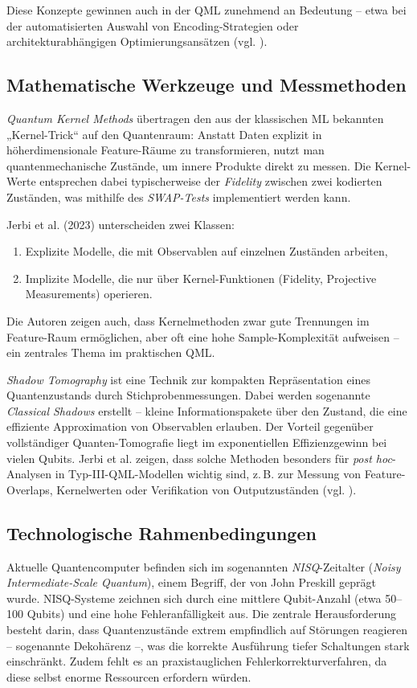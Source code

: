 Diese Konzepte gewinnen auch in der QML zunehmend an Bedeutung – etwa bei der automatisierten Auswahl von Encoding-Strategien oder architekturabhängigen Optimierungsansätzen (vgl. \cite{liuQuantumTrainRethinkingHybrid2024}).



\subsection{Mathematische Werkzeuge und Messmethoden}  
\textit{Quantum Kernel Methods}
übertragen den aus der klassischen ML bekannten „Kernel-Trick“ auf den Quantenraum: Anstatt Daten explizit in höherdimensionale Feature-Räume zu transformieren, nutzt man quantenmechanische Zustände, um innere Produkte direkt zu messen. Die Kernel-Werte entsprechen dabei typischerweise der \textit{Fidelity} zwischen zwei kodierten Zuständen, was mithilfe des \textit{SWAP-Tests} implementiert werden kann.  

Jerbi et al. (2023) unterscheiden zwei Klassen:
\begin{enumerate}
  \item Explizite Modelle, die mit Observablen auf einzelnen Zuständen arbeiten,
  \item Implizite Modelle, die nur über Kernel-Funktionen (Fidelity, Projective Measurements) operieren.
\end{enumerate}
Die Autoren zeigen auch, dass Kernelmethoden zwar gute Trennungen im Feature-Raum ermöglichen, aber oft eine hohe Sample-Komplexität aufweisen – ein zentrales Thema im praktischen QML.

\vspace{0.3cm}

\textit{Shadow Tomography} ist eine Technik zur kompakten Repräsentation eines Quantenzustands durch Stichprobenmessungen. Dabei werden sogenannte \textit{Classical Shadows} erstellt – kleine Informationspakete über den Zustand, die eine effiziente Approximation von Observablen erlauben. Der Vorteil gegenüber vollständiger Quanten-Tomografie liegt im exponentiellen Effizienzgewinn bei vielen Qubits. Jerbi et al. zeigen, dass solche Methoden besonders für \textit{post hoc}-Analysen in Typ-III-QML-Modellen wichtig sind, z.\,B. zur Messung von Feature-Overlaps, Kernelwerten oder Verifikation von Outputzuständen (vgl. \cite{jerbi_quantum_2023}).




\subsection{Technologische Rahmenbedingungen}  
Aktuelle Quantencomputer befinden sich im sogenannten \textit{NISQ}-Zeitalter (\textit{Noisy Intermediate-Scale Quantum}), einem Begriff, der von John Preskill geprägt wurde. NISQ-Systeme zeichnen sich durch eine mittlere Qubit-Anzahl (etwa 50–100 Qubits) und eine hohe Fehleranfälligkeit aus. Die zentrale Herausforderung besteht darin, dass Quantenzustände extrem empfindlich auf Störungen reagieren – sogenannte Dekohärenz –, was die korrekte Ausführung tiefer Schaltungen stark einschränkt. Zudem fehlt es an praxistauglichen Fehlerkorrekturverfahren, da diese selbst enorme Ressourcen erfordern würden.  

